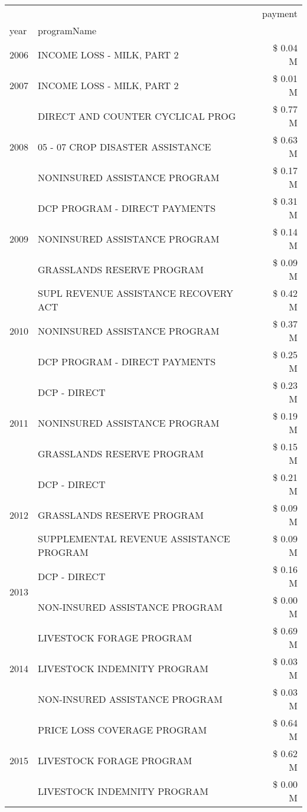 \begin{tabular}{llr}
\toprule
 &  & payment \\
year & programName &  \\
\midrule
2006 & INCOME LOSS - MILK, PART 2 & \$ 0.04 M \\
\cline{1-3}
2007 & INCOME LOSS - MILK, PART 2 & \$ 0.01 M \\
\cline{1-3}
\multirow[t]{3}{*}{2008} & DIRECT AND COUNTER CYCLICAL PROG & \$ 0.77 M \\
 & 05 - 07 CROP DISASTER ASSISTANCE & \$ 0.63 M \\
 & NONINSURED ASSISTANCE PROGRAM & \$ 0.17 M \\
\cline{1-3}
\multirow[t]{3}{*}{2009} & DCP PROGRAM - DIRECT PAYMENTS & \$ 0.31 M \\
 & NONINSURED ASSISTANCE PROGRAM & \$ 0.14 M \\
 & GRASSLANDS RESERVE PROGRAM & \$ 0.09 M \\
\cline{1-3}
\multirow[t]{3}{*}{2010} & SUPL REVENUE ASSISTANCE RECOVERY ACT & \$ 0.42 M \\
 & NONINSURED ASSISTANCE PROGRAM & \$ 0.37 M \\
 & DCP PROGRAM - DIRECT PAYMENTS & \$ 0.25 M \\
\cline{1-3}
\multirow[t]{3}{*}{2011} & DCP - DIRECT & \$ 0.23 M \\
 & NONINSURED ASSISTANCE PROGRAM & \$ 0.19 M \\
 & GRASSLANDS RESERVE PROGRAM & \$ 0.15 M \\
\cline{1-3}
\multirow[t]{3}{*}{2012} & DCP - DIRECT & \$ 0.21 M \\
 & GRASSLANDS RESERVE PROGRAM & \$ 0.09 M \\
 & SUPPLEMENTAL REVENUE ASSISTANCE PROGRAM & \$ 0.09 M \\
\cline{1-3}
\multirow[t]{2}{*}{2013} & DCP - DIRECT & \$ 0.16 M \\
 & NON-INSURED ASSISTANCE PROGRAM & \$ 0.00 M \\
\cline{1-3}
\multirow[t]{3}{*}{2014} & LIVESTOCK FORAGE PROGRAM & \$ 0.69 M \\
 & LIVESTOCK INDEMNITY PROGRAM & \$ 0.03 M \\
 & NON-INSURED ASSISTANCE PROGRAM & \$ 0.03 M \\
\cline{1-3}
\multirow[t]{3}{*}{2015} & PRICE LOSS COVERAGE PROGRAM & \$ 0.64 M \\
 & LIVESTOCK FORAGE PROGRAM & \$ 0.62 M \\
 & LIVESTOCK INDEMNITY PROGRAM & \$ 0.00 M \\

\end{tabular}
